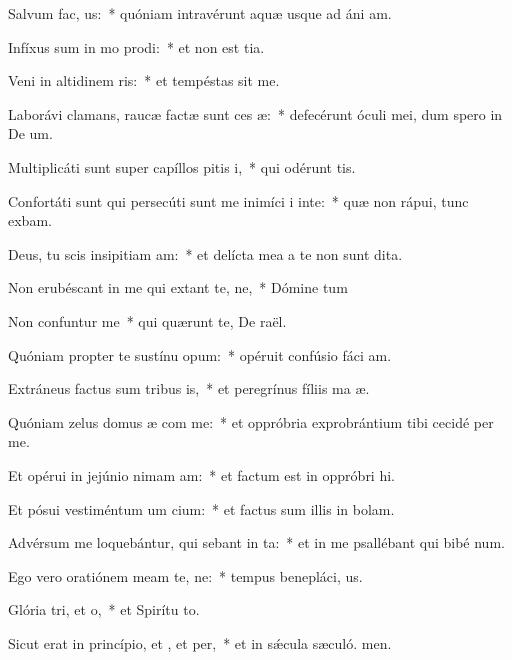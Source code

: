 \item Salvum  fac, us:~* quóniam intravérunt aquæ usque ad áni am.
\item Infíxus sum in mo prodi:~* et non est tia.
\item Veni in altidinem ris:~* et tempéstas sit me.
\item Laborávi clamans, raucæ factæ sunt ces æ:~* defecérunt óculi mei, dum spero in De um.
\item Multiplicáti sunt super capíllos pitis i,~* qui odérunt  tis.
\item Confortáti sunt qui persecúti sunt me inimíci i inte:~* quæ non rápui, tunc exbam.
\item Deus, tu scis insipitiam am:~* et delícta mea a te non sunt dita.
\item Non erubéscant in me qui extant te, ne,~* Dómine tum
\item Non confuntur  me~* qui quærunt te, De raël.
\item Quóniam propter te sustínu opum:~* opéruit confúsio fáci am.
\item Extráneus factus sum tribus is,~* et peregrínus fíliis ma æ.
\item Quóniam zelus domus æ com me:~* et oppróbria exprobrántium tibi cecidé per me.
\item Et opérui in jejúnio nimam am:~* et factum est in oppróbri hi.
\item Et pósui vestiméntum um cium:~* et factus sum illis in bolam.
\item Advérsum me loquebántur, qui sebant in ta:~* et in me psallébant qui bibé num.
\item Ego vero oratiónem meam  te, ne:~* tempus benepláci, us.
\item Glória tri, et o,~* et Spirítu to.
\item Sicut erat in princípio, et , et per,~* et in sǽcula sæculó. men.
